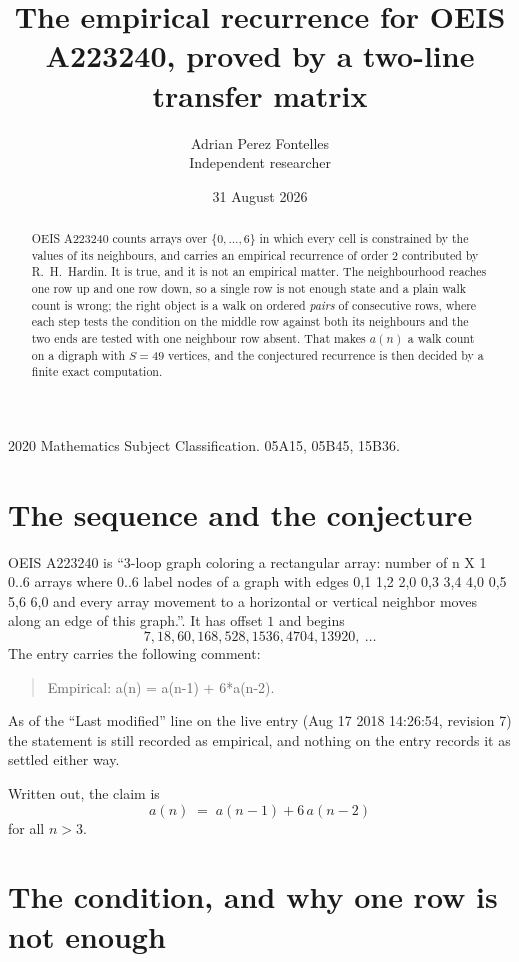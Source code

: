 \documentclass[11pt,a4paper]{article}
\title{The empirical recurrence for OEIS A223240, proved by a two-line transfer matrix}
\author{Adrian Perez Fontelles\\ \small Independent researcher}
\date{31 August 2026}
\theoremstyle{plain}
\theoremstyle{definition}
\begin{document}
\maketitle

\begin{abstract}
OEIS A223240 counts arrays over $\{0,\dots,6\}$ in which every cell is constrained by the
values of its neighbours, and carries an empirical recurrence of order $2$ contributed
by R.~H.~Hardin. It is true, and it is not an empirical matter. The neighbourhood reaches one
row up and one row down, so a single row is not enough state and a plain walk count
is wrong; the right object is a walk on ordered \emph{pairs} of consecutive rows, where
each step tests the condition on the middle row against both its neighbours and the two
ends are tested with one neighbour row absent. That makes $a(n)$ a walk count on a digraph
with $S=49$ vertices, and the conjectured recurrence is then decided by a finite exact
computation.
\end{abstract}

\noindent\small 2020 Mathematics Subject Classification. 05A15, 05B45, 15B36.\normalsize

\section{The sequence and the conjecture}

OEIS A223240 is ``3-loop graph coloring a rectangular array: number of n X 1 0..6 arrays where 0..6 label nodes of a graph with edges 0,1 1,2 2,0 0,3 3,4 4,0 0,5 5,6 6,0 and every array movement to a horizontal or vertical neighbor moves along an edge of this graph.''. It has offset $1$ and begins
\[
7, 18, 60, 168, 528, 1536, 4704, 13920,\ \dots
\]
The entry carries the following comment:
\begin{quote}\small
Empirical: a(n) = a(n-1) + 6*a(n-2).
\end{quote}
As of the ``Last modified'' line on the live entry (Aug 17 2018 14:26:54, revision 7) the statement is
still recorded as empirical, and nothing on the entry records it as settled either way.

Written out, the claim is
\begin{equation}\label{eq:conj}
a(n)\;=\;a(n-1) + 6\,a(n-2)
\end{equation}
for all $n>3$.

\section{The condition, and why one row is not enough}
\end{document}
